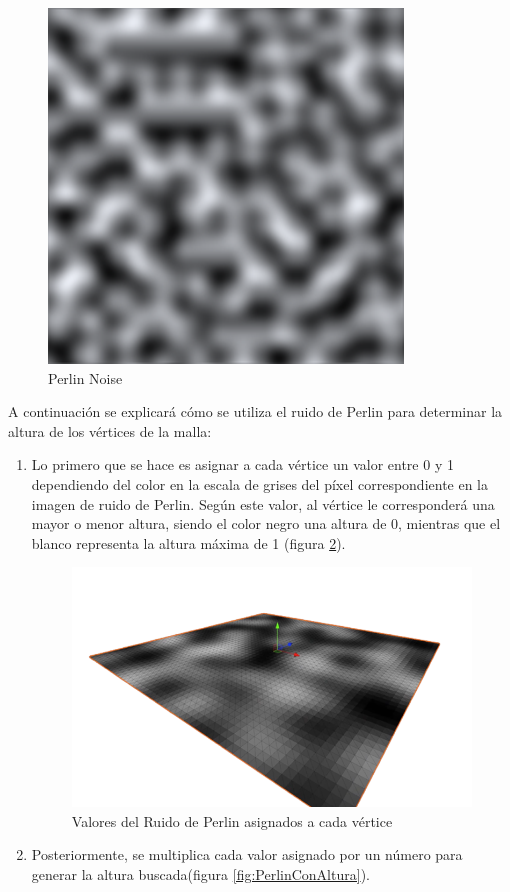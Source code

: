 \begin{enumerate}
\begin{enumerate}
    \begin{figure}[h]
	\centering
	\includegraphics[scale=0.5]{img/PerlinNoise.png}
	\caption{Perlin Noise}
	\label{fig:RuidoDePerlin}
    \end{figure}
    A continuación se explicará cómo se utiliza el ruido de Perlin para determinar la altura de los vértices de la malla:
    \begin{enumerate}
    \item Lo primero que se hace es asignar a cada vértice un valor entre 0 y 1 dependiendo del color en la escala de grises del píxel correspondiente en la imagen de ruido de Perlin. Según este valor, al vértice le corresponderá una mayor o menor altura, siendo el color negro una altura de 0, mientras que el blanco representa la altura máxima de 1 (figura \ref{fig:PerlinPlano}).
    
    \begin{figure}[h]
	\centering
	\includegraphics[scale=0.55]{img/PlainPerlin.png}
	\caption{Valores del Ruido de Perlin asignados a cada vértice}
	\label{fig:PerlinPlano}
    \end{figure}
    \item Posteriormente, se multiplica cada valor asignado por un número para generar la altura buscada(figura \ref{fig:PerlinConAltura}).
    

\end{enumerate}
\end{enumerate}
\end{enumerate}
